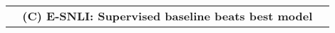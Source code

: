 \begin{table*}[t]
\begin{tabular}{@{}p{0.3\linewidth} p{0.3\linewidth} p{0.3\linewidth} @{}}
\multicolumn{3}{c}{\textbf{(C) E-SNLI: Supervised baseline beats best model}}                                                                                                                                                                                                                                                                                                                                                                                                                                                                                                                                                                                                                                                                                                                                                                                                                                                                                                                                                                                                                                                                                                                                                                                                                                                                                                                                                                                                                                                                                                                                                                                                                                                                                                                                                                                                                                                                                                                                                                                                                                                                                                                                                                                                                                                                                                                                                                                                                                                                                                                                                                                                                                                                                                                                                                                                                                                                                                                                                                                                                                                                                                                                                                                                                                                                                              
\end{tabular}
\end{table*}
